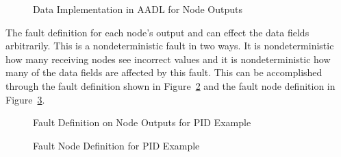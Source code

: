 \begin{figure}[!htb]
        \caption{\label{fig:PIDNodeData} Data Implementation in AADL for Node Outputs}
\end{figure}

The fault definition for %
each node's output and can effect the data fields arbitrarily. This is a nondeterministic fault in two ways. It is nondeterministic how many receiving nodes see incorrect values and it is nondeterministic how many of the data fields are affected by this fault. This can be accomplished through the fault definition shown in Figure~\ref{fig:PIDFaultNode} and the fault node definition in Figure~\ref{fig:PIDFaultDef}. 

\begin{figure}[!htb]
        \caption{\label{fig:PIDFaultNode} Fault Definition on Node Outputs for PID Example}
\end{figure}

\begin{figure}[!htb]
        \caption{\label{fig:PIDFaultDef} Fault Node Definition for PID Example}
\end{figure}

